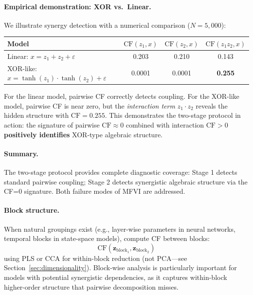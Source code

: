\documentclass[10pt]{article} %
\theoremstyle{plain}
\theoremstyle{definition}
\newcommand{\CF}{\mathrm{CF}}
\begin{document}
\paragraph{Empirical demonstration: XOR vs.\ Linear.} We illustrate synergy detection with a numerical comparison ($N = 5{,}000$):

\begin{center}
\begin{tabular}{lccc}
\toprule
\textbf{Model} & $\CF(z_1, x)$ & $\CF(z_2, x)$ & $\CF(z_1 z_2, x)$ \\
\midrule
Linear: $x = z_1 + z_2 + \varepsilon$ & 0.203 & 0.210 & 0.143 \\
XOR-like: $x = \tanh(z_1) \cdot \tanh(z_2) + \varepsilon$ & 0.0001 & 0.0001 & \textbf{0.255} \\
\bottomrule
\end{tabular}
\end{center}

For the linear model, pairwise CF correctly detects coupling. For the XOR-like model, pairwise CF is near zero, but the \emph{interaction term} $z_1 \cdot z_2$ reveals the hidden structure with $\CF = 0.255$. This demonstrates the two-stage protocol in action: the signature of pairwise $\CF \approx 0$ combined with interaction $\CF > 0$ \textbf{positively identifies} XOR-type algebraic structure.

\paragraph{Summary.} The two-stage protocol provides complete diagnostic coverage: Stage 1 detects standard pairwise coupling; Stage 2 detects synergistic algebraic structure via the CF=0 signature. Both failure modes of MFVI are addressed.

\paragraph{Block structure.} When natural groupings exist (e.g., layer-wise parameters in neural networks, temporal blocks in state-space models), compute CF between blocks:
\begin{equation}
\CF(\mathbf{z}_{\text{block}_1}, \mathbf{z}_{\text{block}_2})
\end{equation}
using PLS or CCA for within-block reduction (not PCA---see Section~\ref{sec:dimensionality}). Block-wise analysis is particularly important for models with potential synergistic dependencies, as it captures within-block higher-order structure that pairwise decomposition misses.
\end{document}

